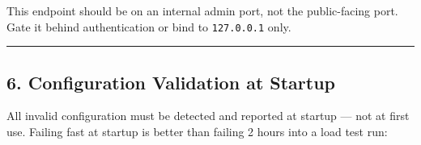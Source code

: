 \documentclass[
]{article}
\begin{document}
This endpoint should be on an internal admin port, not the public-facing
port. Gate it behind authentication or bind to \texttt{127.0.0.1} only.

\begin{center}\rule{0.5\linewidth}{0.5pt}\end{center}

\hypertarget{configuration-validation-at-startup}{%
\subsection{6. Configuration Validation at
Startup}\label{configuration-validation-at-startup}}

All invalid configuration must be detected and reported at startup ---
not at first use. Failing fast at startup is better than failing 2 hours
into a load test run:
\end{document}
